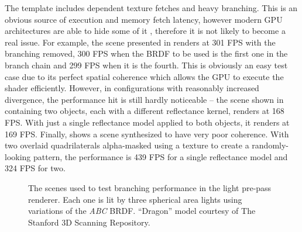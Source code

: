 The template includes dependent texture fetches and heavy branching. This is an obvious source of execution and memory fetch latency, however modern GPU architectures are able to hide some of it \cite{overviewOfGPUArch}, therefore it is not likely to become a real issue. For example, the scene presented in  renders at 301 FPS with the branching removed, 300 FPS when the BRDF to be used is the first one in the branch chain and 299 FPS when it is the fourth. This is obviously an easy test case due to its perfect spatial coherence which allows the GPU to execute the shader efficiently. However, in configurations with reasonably increased divergence, the performance hit is still hardly noticeable -- the scene shown in  containing two objects, each with a different reflectance kernel, renders at 168 FPS. With just a single reflectance model applied to both objects, it renders at 169 FPS. Finally,  shows a scene synthesized to have very poor coherence. With two overlaid quadrilaterals alpha-masked using a texture to create a randomly-looking pattern, the performance is 439 FPS for a single reflectance model and 324 FPS for two.

\begin{figure}[ht!]
  \centering
  \caption[Test scenes for branching performance]{The scenes used to test branching performance in the light pre-pass renderer. Each one is lit by three spherical area lights using variations of the \emph{ABC} BRDF. ``Dragon'' model courtesy of The Stanford 3D Scanning Repository.}
\label{fig:lppBranching}
\end{figure}

